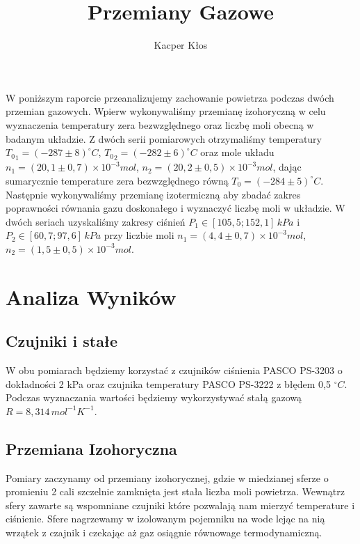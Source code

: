 \documentclass[12pt]{article}
\title{Przemiany Gazowe}
\author{Kacper Kłos}
\begin{document}
\maketitle

W poniższym raporcie przeanalizujemy zachowanie powietrza podczas dwóch przemian gazowych. Wpierw wykonywaliśmy przemianę izohoryczną w celu wyznaczenia temperatury zera bezwzględnego oraz liczbę moli obecną w badanym układzie. Z dwóch serii pomiarowych otrzymaliśmy temperatury \({T_0}_1 = (-287 \pm 8) ^\circ C\), \({T_0}_2 = (-282 \pm 6) ^\circ C\) oraz mole układu \(n_1 = (20{,}1\pm0{,}7) \times 10^{-3} mol\), \(n_2 = (20{,}2\pm0{,}5) \times 10^{-3} mol\), dając sumarycznie temperature zera bezwzględnego równą \(T_0 = (-284 \pm 5) ^\circ C\). Następnie wykonywaliśmy przemianę izotermiczną aby zbadać zakres poprawności równania gazu doskonałego i wyznaczyć liczbę moli w układzie. W dwóch seriach uzyskaliśmy zakresy ciśnień \(P_1 \in [105{,}5; 152{,}1] \, kPa\) i \(P_2 \in [60{,}7; 97{,}6] \, kPa\) przy liczbie moli \(n_1 = (4{,}4\pm0{,}7) \times 10^{-3} mol\), \(n_2 = (1{,}5\pm0{,}5) \times 10^{-3} mol\).

\newpage
\section{Analiza Wyników}
\subsection{Czujniki i stałe}
W obu pomiarach będziemy korzystać z czujników ciśnienia PASCO PS-3203\cite{pressure} o dokładności 2 kPa oraz czujnika temperatury PASCO PS-3222\cite{temperature} z błędem 0{,}5 \(^\circ C\). Podczas wyznaczania wartości będziemy wykorzystywać stałą gazową\cite{gas_const} \(R = 8{,}314 \, mol^{-1} K^{-1}\).
\subsection{Przemiana Izohoryczna}
Pomiary zaczynamy od przemiany izohorycznej, gdzie w miedzianej sferze o promieniu 2 cali szczelnie zamknięta jest stała liczba moli powietrza. Wewnątrz sfery zawarte są wspomniane czujniki które pozwalają nam mierzyć temperature i ciśnienie. Sfere nagrzewamy w izolowanym pojemniku na wode lejąc na nią wrzątek z czajnik i czekając aż gaz osiągnie równowage termodynamiczną.
\end{document}
